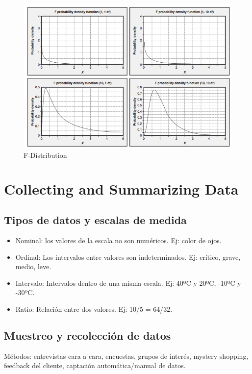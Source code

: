 \documentclass[oneside]{book}
\begin{document}
\begin{figure}[ht!]
	\centering
	\includegraphics[width=120mm]{imagenes/F-Distribution.png}
	\caption{F-Distribution}
	\label{fig:F-Distribution}
\end{figure}

\chapter{Collecting and Summarizing Data}

\section{Tipos de datos y escalas de medida}

\begin{itemize}
	\item Nominal: los valores de la escala no son numéricos. Ej: color de ojos.
	\item Ordinal: Los intervalos entre valores son indeterminados. Ej: crítico, grave, medio, leve.
	\item Intervalo: Intervalos dentro de una misma escala. Ej: 40ºC y 20ºC, -10ºC y -30ºC.
	\item Ratio: Relación entre dos valores. Ej: 10/5 = 64/32.
\end{itemize}

\section{Muestreo y recolección de datos}

Métodos: entrevistas cara a cara, encuestas, grupos de interés, mystery shopping, feedback del cliente, captación automática/manual de datos.
\end{document}
